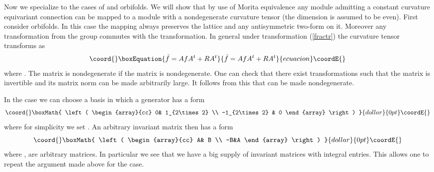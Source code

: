 \documentclass[a4paper,a4paper]{article}
\begin{document}
{%
Now we specialize to the cases of \coordHE{} and \coordHE{} orbifolds. 
We will show that by  use of Morita equivalence any module admitting a 
constant curvature equivariant connection can be mapped to a module with a nondegenerate 
curvature tensor (the dimension \coordHE{}  is assumed to be even).
First consider \coordHE{} orbifolds. 
In this case the mapping \coordHE{} always preserves the lattice \coordHE{} and any antisymmetric 
two-form \myHighlight{$\theta$}\coordHE{} on it. Moreover any transformation from the group \coordHE{} 
commutes with the \coordHE{} transformation. In general under transformation (\ref{fractr}) 
the curvature tensor \coordHE{} transforms as 
\begin{equation}\coord{}\boxEquation{
\tilde f = AfA^{t} + RA^{t}
}{
\tilde f = AfA^{t} + RA^{t}
}{ecuacion}\coordE{}\end{equation}
where \coordHE{}. The matrix \coordHE{} is  nondegenerate if the matrix 
\coordHE{} is nondegenerate. One can check that there exist \coordHE{} transformations 
such that the matrix \coordHE{} is invertible and its matrix norm can be made arbitrarily large. 
It follows from this  that \coordHE{} can be made nondegenerate. 


In the \coordHE{} case  we can choose a basis in which a \coordHE{} generator has a form
$$\coord{}\boxMath{
\left(
\begin{array}{cc}
0&  1_{2\times 2} \\
-1_{2\times 2} & 0
\end{array} \right)
}{dollar}{0pt}\coordE{}$$
where for simplicity we set  \coordHE{}. An arbitrary \coordHE{} invariant matrix then has a form 
$$\coord{}\boxMath{
\left( \begin{array}{cc}
A& B \\
-B&A
\end{array} \right)
}{dollar}{0pt}\coordE{}$$  
where \coordHE{}, \coordHE{} are arbitrary \coordHE{} matrices. In particular we see that we 
have a big supply of invariant matrices with integral entries. This allows one to repeat 
the argument made above for the \coordHE{} case.




}
\end{document}
